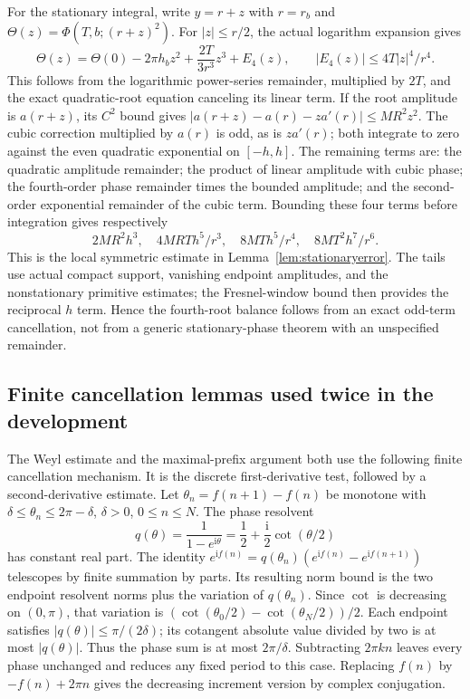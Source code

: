 \documentclass[11pt,a4paper]{article}
\numberwithin{equation}{section}
\theoremstyle{definition}
\newcommand{\ii}{\mathrm i}
\begin{document}
For the stationary integral, write $y=r+z$ with $r=r_b$ and
$\Theta(z)=\Phi(T,b;(r+z)^2)$.
For $|z|\le r/2$, the actual logarithm expansion gives
\[
 \Theta(z)=\Theta(0)-2\pi h_bz^2+\frac{2T}{3r^3}z^3+E_4(z),
 \qquad |E_4(z)|\le4T|z|^4/r^4.
\]
This follows from the logarithmic power-series remainder, multiplied by $2T$,
and the exact quadratic-root equation canceling its linear term.
If the root amplitude is $a(r+z)$, its $C^2$ bound gives
$|a(r+z)-a(r)-za'(r)|\le MR^2z^2$.
The cubic correction multiplied by $a(r)$ is odd, as is $za'(r)$; both
integrate to zero against the even quadratic exponential on $[-h,h]$.
The remaining terms are: the quadratic amplitude remainder;
the product of linear amplitude with cubic phase;
the fourth-order phase remainder times the bounded amplitude; and the
second-order exponential remainder of the cubic term.
Bounding these four terms before integration gives respectively
\[
 2MR^2h^3,\quad4MRT h^5/r^3,\quad8MTh^5/r^4,
                    \quad8MT^2h^7/r^6.
\]
This is the local symmetric estimate in Lemma~\ref{lem:stationaryerror}.
The tails use actual compact support, vanishing endpoint amplitudes,
and the nonstationary primitive estimates; the Fresnel-window bound then
provides the reciprocal $h$ term. Hence the fourth-root balance follows from
an exact odd-term cancellation, not from a generic stationary-phase theorem
with an unspecified remainder.

\subsection{Finite cancellation lemmas used twice in the development}
The Weyl estimate and the maximal-prefix argument both use the following
finite cancellation mechanism. It is the discrete first-derivative test,
followed by a second-derivative estimate.
Let $\theta_n=f(n+1)-f(n)$ be monotone with
$\delta\le\theta_n\le2\pi-\delta$, $\delta>0$, $0\le n\le N$.
The phase resolvent
\[
 q(\theta)=\frac1{1-e^{\ii\theta}}
           =\frac12+\frac{\ii}2\cot(\theta/2)
\]
has constant real part. The identity
$e^{\ii f(n)}=q(\theta_n)(e^{\ii f(n)}-e^{\ii f(n+1)})$
telescopes by finite summation by parts. Its resulting norm bound is the two
endpoint resolvent norms plus the variation of $q(\theta_n)$.
Since $\cot$ is decreasing on $(0,\pi)$, that variation is
$(\cot(\theta_0/2)-\cot(\theta_N/2))/2$. Each endpoint satisfies
$|q(\theta)|\le\pi/(2\delta)$; its cotangent absolute value divided by two
is at most $|q(\theta)|$. Thus the phase sum is at most $2\pi/\delta$.
Subtracting $2\pi kn$ leaves every phase unchanged and reduces any fixed
period to this case. Replacing $f(n)$ by $-f(n)+2\pi n$ gives the decreasing
increment version by complex conjugation.
\end{document}

